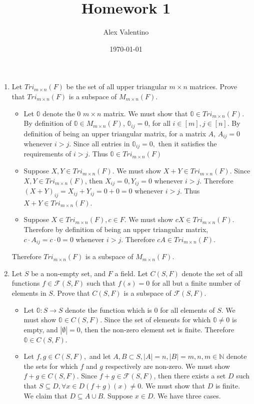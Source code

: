 \documentclass[12pt, letterpaper]{article}
\date{\today}
\author{Alex Valentino}
\title{Homework 1}
\newcommand{\N}{\mathbb{N}}
\begin{document}
	


	\begin{enumerate}
		\item Let $Tri_{m\times n} (F)$ be the set of  all upper triangular $m\times n$ matrices.  Prove that $Tri_{m\times n} (F)$ is a subspace of $M_{m\times n} (F)$.
		\begin{itemize}
			\item Let $\mathbb{0}$ denote the 0 $m\times n$ matrix.  We must show that $\mathbb{0} \in Tri_{m\times n} (F)$.  By definition of $\mathbb{0} \in M_{m\times n} (F)$, $\mathbb{0}_{ij} = 0$, for all $i \in [m], j \in [n].$  By definition of being an upper triangular matrix, for a matrix $A$, $A_{ij} = 0$ whenever $i > j$.  Since all entries in $\mathbb{0}_{ij} = 0,$ then it satisfies the requirements of $i > j.$  Thus $\mathbb{0} \in  Tri_{m\times n} (F)$
			\item Suppose $X,Y \in Tri_{m\times n}(F).$  We must show $X+Y \in Tri_{m\times n}(F)$.  Since $X,Y \in Tri_{m\times n}(F)$, then $X_{ij} = 0, Y_{ij} = 0$ whenever $i > j$.  Therefore $(X+Y)_{ij} = X_{ij} + Y_{ij} = 0 + 0 = 0$ whenever $i > j$.  Thus $X+Y \in Tri_{m\times n}(F)$.
			\item Suppose $X \in Tri_{m\times n}(F), c \in F.$  We must show $cX \in Tri_{m\times n}(F)$.  Therefore by definition of being an upper triangular matrix, $c\cdot A_{ij} = c\cdot 0 = 0$ whenever $i > j$.  Therefore $cA \in Tri_{m\times n}(F)$. 
		\end{itemize}
		Therefore $Tri_{m\times n}(F)$ is a subspace of $M_{m\times n}(F)$.
		\newpage
		\item Let $S$ be a non-empty set, and $F$ a field.  Let $C(S,F)$ denote the set of all functions $f \in \mathcal{F}(S,F)$ such that $f(s) = 0$ for all but a finite number of elements in $S$.  Prove that $C(S,F)$ is a subspace of $\mathcal{F}(S,F)$.  
		\begin{itemize}
			\item Let $\mathbb{0}: S \to S$ denote the function which is 0 for all elements of $S$.  We must show $\mathbb{0} \in C(S,F)$.  Since the set of elements for which $\mathbb{0} \neq 0$ is empty, and $|\emptyset| = 0$, then the non-zero element set is finite.  Therefore $\mathbb{0} \in C(S,F)$.
			\item Let $f,g \in C(S,F),$ and let $A,B \subset S, |A| = n, |B| = m, n,m \in \N$ denote the sets for which $f$ and $g$ respectively are non-zero.  We must show $f+g \in C(S,F)$. Since $f+g \in \mathcal{F}(S,F)$, then there exists a set $D$ such that $S \subseteq D, \forall x \in D (f+g)(x) \neq 0$.  We must show that $D$ is finite.  We claim that $D \subseteq A \cup B$.  Suppose $x \in D$.  We have three cases. 

\end{itemize}
\end{enumerate}
\end{document}
